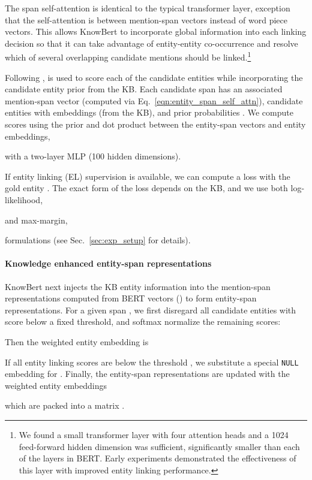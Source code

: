 \documentclass[11pt,a4paper]{article}
\newcommand{\reword}[2]{\textcolor{orange}{#2\sout{#1}}}
\renewcommand{\reword}[2]{#2}
\newcommand{\KBS}[0]{KnowBert }
\begin{document}
The span self-attention is identical to the typical transformer layer, exception that the self-attention is between mention-span vectors instead of word piece vectors.
This allows \KBS to incorporate global information into each linking decision so that it can take advantage of entity-entity co-occurrence and resolve which of several overlapping candidate mentions should be linked.\footnote{We found a small transformer layer with four attention heads and a 1024 feed-forward hidden dimension was sufficient, significantly smaller than each of the layers in BERT.  Early experiments demonstrated the effectiveness of this layer with improved entity linking performance.}

Following \citet{Kolitsas2018EndtoEndNE},  is used to score each of the candidate entities while incorporating the candidate entity prior from the KB.
Each candidate span  has an associated mention-span vector  (computed via Eq.~\ref{eqn:entity_span_self_attn}),  candidate entities with embeddings  (from the KB), and prior probabilities .
We compute  scores using the prior and dot product between the entity-span vectors and entity embeddings,

with a two-layer MLP (100 hidden dimensions).

If entity linking (EL) supervision is available, we can compute a loss with the gold entity .
The exact form of the loss depends on the KB, and we use both log-likelihood,

and max-margin,

formulations (see Sec.~\ref{sec:exp_setup} for details).

\paragraph{Knowledge enhanced entity-span representations} \KBS next injects the KB entity information into the mention-span representations computed from BERT vectors () to form entity-span representations.
For a given span , we first disregard all candidate entities with score  below a fixed threshold, and softmax normalize the remaining scores:

Then the weighted entity embedding is

If all entity linking scores are below the threshold , we substitute a special \texttt{NULL} embedding for .
Finally, the entity-span representations are updated with the weighted entity embeddings

which are packed into a matrix \reword{as usual}{}.
\end{document}
